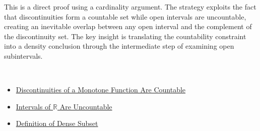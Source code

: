 \begin{remark*}
This is a direct proof using a cardinality argument. The strategy exploits the fact that discontinuities form a countable set while open intervals are uncountable, creating an inevitable overlap between any open interval and the complement of the discontinuity set. The key insight is translating the countability constraint into a density conclusion through the intermediate step of examining open subintervals.
\end{remark*}

\begin{remark*}[Dependencies]~\\
\begin{itemize}
  \item \hyperref[thm:monotone-discontinuities-countable]{Discontinuities of a Monotone Function Are Countable}
  \item \hyperref[thm:intervals-are-uncountable]{Intervals of $\mathbb{R}$ Are Uncountable}
  \item \hyperref[def:dense]{Definition of Dense Subset}
\end{itemize}
\end{remark*}

\clearpage
